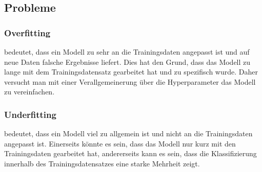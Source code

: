 \subsection{Probleme}

\subsubsection{Overfitting} \label{overfitting} bedeutet, dass ein Modell zu sehr an die Trainingsdaten angepasst ist und auf neue Daten falsche Ergebnisse liefert. Dies hat den Grund, dass das Modell zu lange mit dem Trainingsdatensatz gearbeitet hat und zu spezifisch wurde. Daher versucht man mit einer Verallgemeinerung über die Hyperparameter das Modell zu vereinfachen.

\subsubsection{Underfitting} bedeutet, dass ein Modell viel zu allgemein ist und nicht an die Trainingsdaten angepasst ist. Einerseits könnte es sein, dass das Modell nur kurz mit den Trainingsdaten gearbeitet hat, andererseits kann es sein, dass die Klassifizierung innerhalb des Trainingsdatensatzes eine starke Mehrheit zeigt. \cite{OFUF}